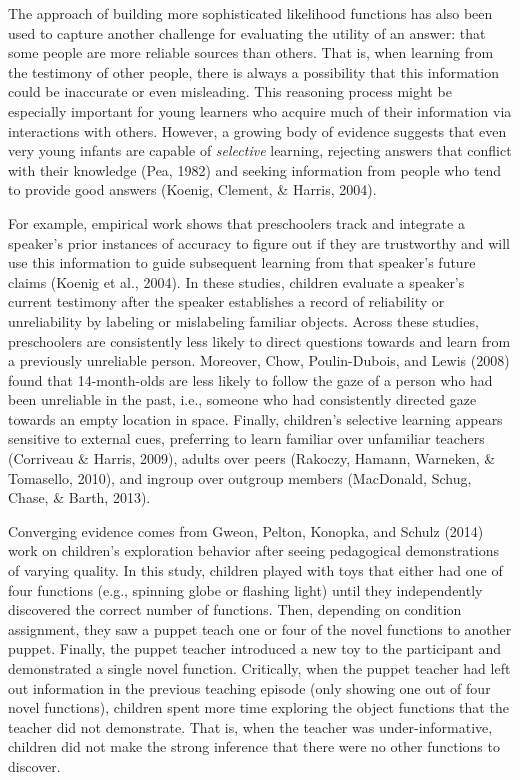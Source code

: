 \documentclass[english,floatsintext,man]{apa6}
\theoremstyle{definition}
\theoremstyle{definition}
\theoremstyle{definition}
\theoremstyle{remark}
\begin{document}
The approach of building more sophisticated likelihood functions has
also been used to capture another challenge for evaluating the utility
of an answer: that some people are more reliable sources than others.
That is, when learning from the testimony of other people, there is
always a possibility that this information could be inaccurate or even
misleading. This reasoning process might be especially important for
young learners who acquire much of their information via interactions
with others. However, a growing body of evidence suggests that even very
young infants are capable of \emph{selective} learning, rejecting
answers that conflict with their knowledge (Pea, 1982) and seeking
information from people who tend to provide good answers (Koenig,
Clement, \& Harris, 2004).

For example, empirical work shows that preschoolers track and integrate
a speaker's prior instances of accuracy to figure out if they are
trustworthy and will use this information to guide subsequent learning
from that speaker's future claims (Koenig et al., 2004). In these
studies, children evaluate a speaker's current testimony after the
speaker establishes a record of reliability or unreliability by labeling
or mislabeling familiar objects. Across these studies, preschoolers are
consistently less likely to direct questions towards and learn from a
previously unreliable person. Moreover, Chow, Poulin-Dubois, and Lewis
(2008) found that 14-month-olds are less likely to follow the gaze of a
person who had been unreliable in the past, i.e., someone who had
consistently directed gaze towards an empty location in space. Finally,
children's selective learning appears sensitive to external cues,
preferring to learn familiar over unfamiliar teachers (Corriveau \&
Harris, 2009), adults over peers (Rakoczy, Hamann, Warneken, \&
Tomasello, 2010), and ingroup over outgroup members (MacDonald, Schug,
Chase, \& Barth, 2013).

Converging evidence comes from Gweon, Pelton, Konopka, and Schulz (2014)
work on children's exploration behavior after seeing pedagogical
demonstrations of varying quality. In this study, children played with
toys that either had one of four functions (e.g., spinning globe or
flashing light) until they independently discovered the correct number
of functions. Then, depending on condition assignment, they saw a puppet
teach one or four of the novel functions to another puppet. Finally, the
puppet teacher introduced a new toy to the participant and demonstrated
a single novel function. Critically, when the puppet teacher had left
out information in the previous teaching episode (only showing one out
of four novel functions), children spent more time exploring the object
functions that the teacher did not demonstrate. That is, when the
teacher was under-informative, children did not make the strong
inference that there were no other functions to discover.
\end{document}
